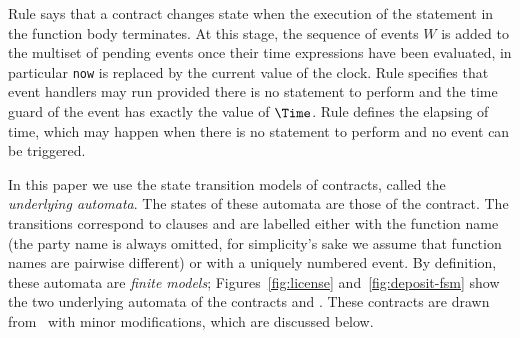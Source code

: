Rule  says that a contract changes state when
the execution of the statement in the function body terminates. At
this stage, the sequence of events $W$ is added to the multiset of
pending events once their time expressions have been evaluated, in
particular \texttt{now} is replaced by the current value of the clock.
%
Rule  specifies that event handlers may run
provided there is no statement to perform and the time guard of the
event has exactly the value of $\Time$.
%
Rule  defines the elapsing of time, which may happen
when there is no statement to perform and no event can be triggered.

In this paper we use the state transition models of {\Stipula}
contracts, called the \emph{underlying automata}. The states of these
automata are those of the {\Stipula} contract. The transitions
correspond to clauses and are labelled either with the function name
(the party name is always omitted, for simplicity's sake we assume
that function names are pairwise different) or with a uniquely
numbered event. By definition, these automata are \emph{finite models};
Figures~\ref{fig:license} and~\ref{fig:deposit-fsm} show the two
underlying automata of the contracts  and
.
%
These contracts are drawn from~\cite{iFM25} with minor modifications, which 
are discussed below. 

